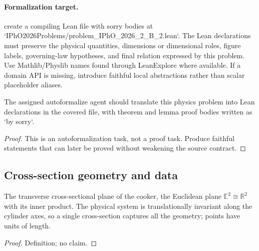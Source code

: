 \paragraph{Formalization target.}
create a compiling Lean file with sorry bodies at `IPhO2026Problems/problem\_IPhO\_2026\_2\_B\_2.lean`.
The Lean declarations must preserve the physical quantities, dimensions or dimensional roles, figure labels, governing-law hypotheses, and final relation expressed by this problem.
Use Mathlib/Physlib names found through LeanExplore where available. If a domain API is missing, introduce faithful local abstractions rather than scalar placeholder aliases.

\begin{theorem}
\label{thm:physics:IPhO_2026_2_B_2:target}
The assigned autoformalize agent should translate this physics problem into Lean declarations in the covered file, with theorem and lemma proof bodies written as `by sorry`.
\end{theorem}
\begin{proof}
This is an autoformalization task, not a proof task. Produce faithful statements that can later be proved without weakening the source contract.
\end{proof}


\subsection*{Cross-section geometry and data}

\begin{definition}
\label{def:IPhO2026Problems_problem_IPhO_2026_2_B_2:Plane}
The transverse cross-sectional plane of the cooker, the Euclidean plane
$\mathbb{E}^2 \cong \mathbb{R}^2$ with its inner product.  The physical
system is translationally invariant along the cylinder axes, so a single
cross-section captures all the geometry; points have units of length.
\end{definition}
\begin{proof}
Definition; no claim.
\end{proof}

